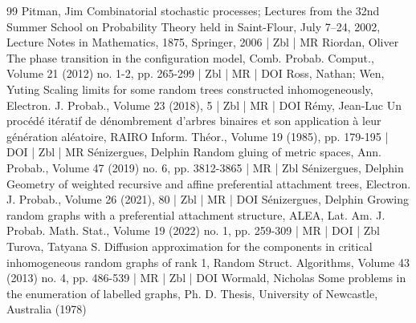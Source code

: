 \documentclass[10pt]{amsart}
\theoremstyle{definition}\newtheorem{defi}[theo]{Definition}\newtheorem{rema}[theo]{Remark}\newtheorem{exam}[theo]{Example}\newtheorem{exem}[theo]{Example}\newtheorem{nota}[theo]{Notation}
\begin{document}
\begin{thebibliography}{99}
Pitman, Jim Combinatorial stochastic processes; Lectures from the 32nd Summer School on Probability Theory held in Saint-Flour, July 7–24, 2002, Lecture Notes in Mathematics, 1875, Springer, 2006 | Zbl | MR
Riordan, Oliver The phase transition in the configuration model, Comb. Probab. Comput., Volume 21 (2012) no. 1-2, pp. 265-299 | Zbl | MR | DOI
Ross, Nathan; Wen, Yuting Scaling limits for some random trees constructed inhomogeneously, Electron. J. Probab., Volume 23 (2018), 5 | Zbl | MR | DOI
Rémy, Jean-Luc Un procédé itératif de dénombrement d’arbres binaires et son application à leur génération aléatoire, RAIRO Inform. Théor., Volume 19 (1985), pp. 179-195 | DOI | Zbl | MR
Sénizergues, Delphin Random gluing of metric spaces, Ann. Probab., Volume 47 (2019) no. 6, pp. 3812-3865 | MR | Zbl
Sénizergues, Delphin Geometry of weighted recursive and affine preferential attachment trees, Electron. J. Probab., Volume 26 (2021), 80 | Zbl | MR | DOI
Sénizergues, Delphin Growing random graphs with a preferential attachment structure, ALEA, Lat. Am. J. Probab. Math. Stat., Volume 19 (2022) no. 1, pp. 259-309 | MR | DOI | Zbl
Turova, Tatyana S. Diffusion approximation for the components in critical inhomogeneous random graphs of rank 1, Random Struct. Algorithms, Volume 43 (2013) no. 4, pp. 486-539 | MR | Zbl | DOI
Wormald, Nicholas Some problems in the enumeration of labelled graphs, Ph. D. Thesis, University of Newcastle, Australia (1978)
\end{thebibliography}
\end{document}
